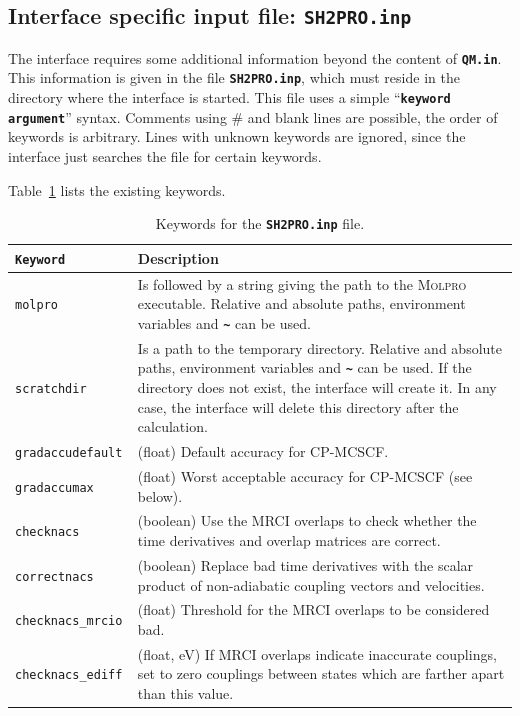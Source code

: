 \documentclass[a4paper,11pt,DIV=15,openany,twoside=false]{scrbook}
\newcommand{\ttt}[1]{\textbf{\texttt{#1}}}
\begin{document}
\subsection{Interface specific input file: \ttt{SH2PRO.inp}}

The interface requires some additional information beyond the content of \ttt{QM.in}. This information is given in the file \ttt{SH2PRO.inp}, which must reside in the directory where the interface is started. This file uses a simple ``\ttt{keyword argument}'' syntax. Comments using \# and blank lines are possible, the order of keywords is arbitrary. Lines with unknown keywords are ignored, since the interface just searches the file for certain keywords.

Table~\ref{tab:molpro_sh2} lists the existing keywords.

\begin{table}
  \centering
  \caption{Keywords for the \ttt{SH2PRO.inp} file.}
  \label{tab:molpro_sh2}
  \begin{tabular}{>{\tt}lp{12cm}}
  \toprule
  Keyword       &Description\\
  \midrule
  molpro          &Is followed by a string giving the path to the \textsc{Molpro} executable. Relative and absolute paths, environment variables and \ttt{\textasciitilde} can be used.\\
  scratchdir      &Is a path to the temporary directory. Relative and absolute paths, environment variables and \ttt{\textasciitilde} can be used. If the directory does not exist, the interface will create it. In any case, the interface will delete this directory after the calculation.\\
  gradaccudefault &(float) Default accuracy for CP-MCSCF.\\
  gradaccumax     &(float) Worst acceptable accuracy for CP-MCSCF (see below).\\
  checknacs       &(boolean) Use the MRCI overlaps to check whether the time derivatives and overlap matrices are correct.\\
  correctnacs     &(boolean) Replace bad time derivatives with the scalar product of non-adiabatic coupling vectors and velocities.\\
  checknacs\_mrcio &(float) Threshold for the MRCI overlaps to be considered bad.\\
  checknacs\_ediff &(float, eV) If MRCI overlaps indicate inaccurate couplings, set to zero couplings between states which are farther apart than this value.\\
  \bottomrule
  \end{tabular}
\end{table}
\end{document}
